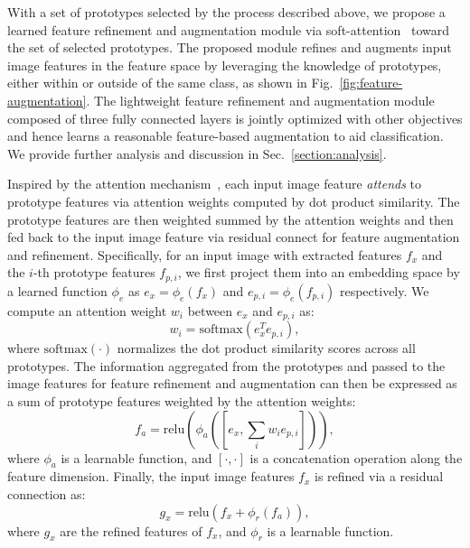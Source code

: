 \documentclass[runningheads]{llncs}
\begin{document}
With a set of prototypes selected by the process described above, we propose a learned feature refinement and augmentation module via soft-attention~\cite{vaswani2017attention} toward the set of selected prototypes.
The proposed module refines and augments input image features in the feature space by leveraging the knowledge of prototypes, either within or outside of the same class, as shown in Fig.~\ref{fig:feature-augmentation}.
The lightweight feature refinement
and augmentation module composed of three fully connected layers is jointly optimized with other objectives and hence learns a reasonable feature-based augmentation to aid classification.
We provide further analysis and discussion in Sec.~\ref{section:analysis}.


Inspired by the attention mechanism~\cite{vaswani2017attention}, each input image feature \emph{attends} to prototype features via attention weights computed by dot product similarity.
The prototype features are then weighted summed by the attention weights and then fed back to the input image feature via residual connect for feature augmentation and refinement.
Specifically, for an input image with extracted features $f_x$ and the $i$-th prototype features $f_{p,i}$, we first project them into an embedding space by a learned function $\phi_e$ as $e_x = \phi_e(f_x)$ and $e_{p,i} = \phi_e(f_{p,i})$ respectively.
We compute an attention weight $w_i$ between $e_x$ and $e_{p,i}$ as:
\begin{equation} \label{eq:attention}
    w_i = \text{softmax}(e_x^T e_{p,i}),
\end{equation}
where $\text{softmax}(\cdot)$ normalizes the dot product similarity scores across all prototypes.
The information aggregated from the prototypes and passed to the image features for feature refinement and augmentation can then be expressed as a sum of prototype features weighted by the attention weights:
\begin{equation} \label{eq:weighted-sum}
    f_a = \text{relu}(\phi_a([e_x,\sum_{i} w_i e_{p,i}])),
\end{equation}
where $\phi_a$ is a learnable function, and $[\cdot,\cdot]$ is a concatenation operation along the feature dimension.
Finally, the input image features $f_x$ is refined via a residual connection as:
\begin{equation} \label{eq:refine}
    g_x = \text{relu}(f_x + \phi_r(f_a)),
\end{equation}
where $g_x$ are the refined features of $f_x$, and $\phi_r$ is a learnable function.
\end{document}
